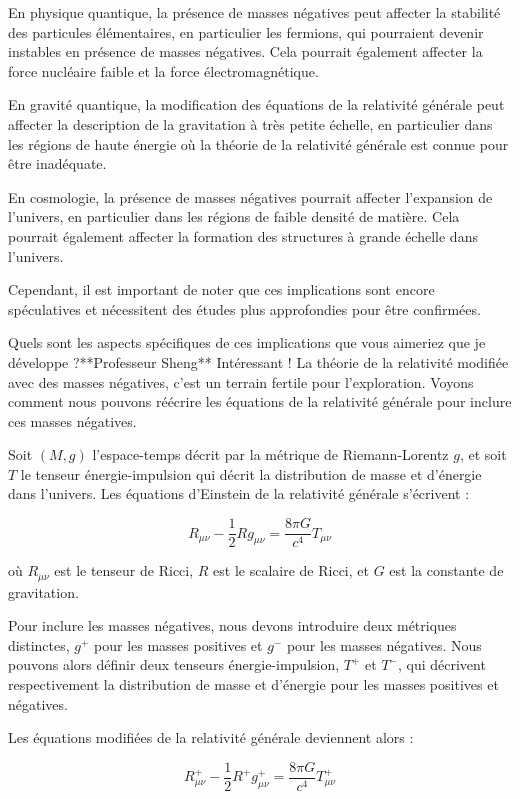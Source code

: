 En physique quantique, la présence de masses négatives peut affecter la stabilité des particules élémentaires, en particulier les fermions, qui pourraient devenir instables en présence de masses négatives. Cela pourrait également affecter la force nucléaire faible et la force électromagnétique.

En gravité quantique, la modification des équations de la relativité générale peut affecter la description de la gravitation à très petite échelle, en particulier dans les régions de haute énergie où la théorie de la relativité générale est connue pour être inadéquate.

En cosmologie, la présence de masses négatives pourrait affecter l'expansion de l'univers, en particulier dans les régions de faible densité de matière. Cela pourrait également affecter la formation des structures à grande échelle dans l'univers.

Cependant, il est important de noter que ces implications sont encore spéculatives et nécessitent des études plus approfondies pour être confirmées.

Quels sont les aspects spécifiques de ces implications que vous aimeriez que je développe ?**Professeur Sheng**
Intéressant ! La théorie de la relativité modifiée avec des masses négatives, c'est un terrain fertile pour l'exploration. Voyons comment nous pouvons réécrire les équations de la relativité générale pour inclure ces masses négatives.

Soit $(M,g)$ l'espace-temps décrit par la métrique de Riemann-Lorentz $g$, et soit $T$ le tenseur énergie-impulsion qui décrit la distribution de masse et d'énergie dans l'univers. Les équations d'Einstein de la relativité générale s'écrivent :

$$R_{\mu\nu} - \frac{1}{2}Rg_{\mu\nu} = \frac{8\pi G}{c^4}T_{\mu\nu}$$

où $R_{\mu\nu}$ est le tenseur de Ricci, $R$ est le scalaire de Ricci, et $G$ est la constante de gravitation.

Pour inclure les masses négatives, nous devons introduire deux métriques distinctes, $g^+$ pour les masses positives et $g^-$ pour les masses négatives. Nous pouvons alors définir deux tenseurs énergie-impulsion, $T^+$ et $T^-$, qui décrivent respectivement la distribution de masse et d'énergie pour les masses positives et négatives.

Les équations modifiées de la relativité générale deviennent alors :

$$R^+_{\mu\nu} - \frac{1}{2}R^+g^+_{\mu\nu} = \frac{8\pi G}{c^4}T^+_{\mu\nu}$$

